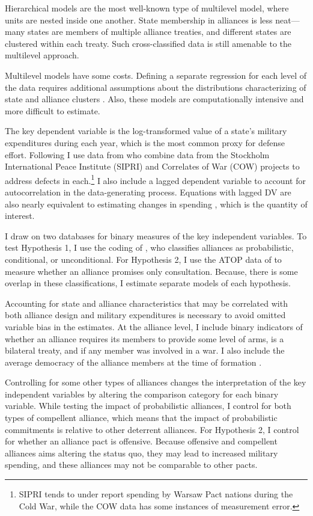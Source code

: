 \documentclass[12pt]{article}
\begin{document}
Hierarchical models are the most well-known type of multilevel model, where units are nested inside one another. State membership in alliances is less neat--- many states are members of multiple alliance treaties, and different states are clustered within each treaty. Such cross-classified data is still amenable to the multilevel approach. 

Multilevel models have some costs. Defining a separate regression for each level of the data requires additional assumptions about the distributions characterizing of state and alliance clusters \citep{McElreath2016}. Also, these models are computationally intensive and more difficult to estimate. 

The key dependent variable is the log-transformed value of a state's military expenditures during each year, which is the most common proxy for defense effort. Following\citet{DigiuseppePoast2016} I use data from \citet{Nordhausetal2012} who combine data from the Stockholm International Peace Institute (SIPRI) and Correlates of War (COW) projects to address defects in each.\footnote{SIPRI tends to under report spending by Warsaw Pact nations during the Cold War, while the COW data has some instances of measurement error.} I also include a lagged dependent variable to account for autocorrelation in the data-generating process. Equations with lagged DV are also nearly equivalent to estimating changes in spending \citep{DeBoefKeele2008}, which is the quantity of interest. 

I draw on two databases for binary measures of the key independent variables. To test Hypothesis 1, I use the coding of \citet{Benson2012}, who classifies alliances as probabilistic, conditional, or unconditional. For Hypothesis 2, I use the ATOP data of \citet{Leedsetal2002} to measure whether an alliance promises only consultation.  Because, there is some overlap in these classifications, I estimate separate models of each hypothesis. 

Accounting for state and alliance characteristics that may be correlated with both alliance design and military expenditures is necessary to avoid omitted variable bias in the estimates. At the alliance level, I include binary indicators of whether an alliance requires its members to provide some level of arms, is a bilateral treaty, and if any member was involved in a war. I also include the average democracy of the alliance members at the time of formation  \citep{Chibaetal2015}. 

Controlling for some other types of alliances changes the interpretation of the key independent variables by altering the comparison category for each binary variable. While testing the impact of probabilistic alliances, I control for both types of compellent alliance, which means that the impact of probabilistic commitments is relative to other deterrent alliances. For Hypothesis 2, I control for whether an alliance pact is offensive. Because offensive and compellent alliances aims altering the status quo, they may lead to increased military spending, and these alliances may not be comparable to other pacts.   
\end{document}
